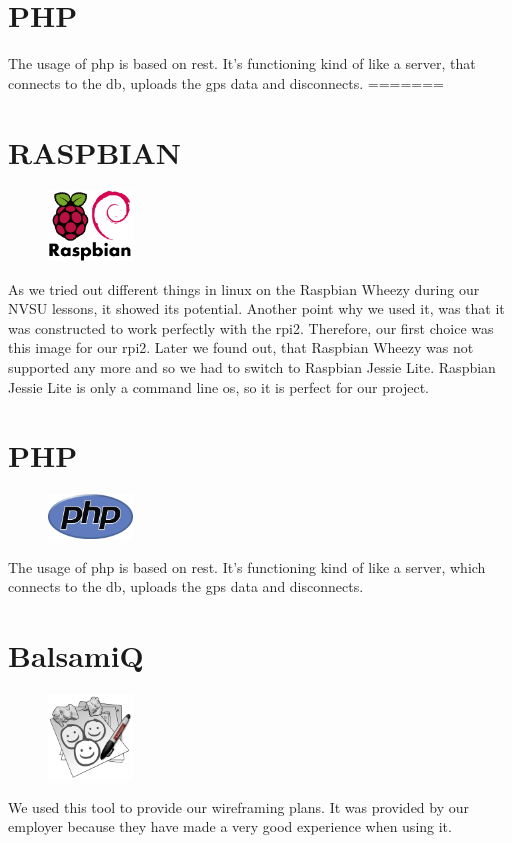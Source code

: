 \section{PHP}
The usage of \gls{php} is based on \gls{rest}. It's functioning kind of like a server, that connects to the \gls{db}, uploads the \gls{gps} data and disconnects.
=======
\section{RASPBIAN}
\begin{figure}
  \begin{center}
    \includegraphics[width=0.2\textwidth] {bilder/raspbian}
  \end{center}
\end{figure}
As we tried out different things in linux on the Raspbian Wheezy during our NVSU lessons, it showed its potential. Another point why we used it, was that it was constructed to work perfectly with the \gls{rpi2}. Therefore, our first choice was this image for our \gls{rpi2}. Later we found out, that Raspbian Wheezy was not supported any more and so we had to switch to Raspbian Jessie Lite. Raspbian Jessie Lite is only a command line \gls{os}, so it is perfect for our project.
\section{PHP}
\begin{figure}
  \begin{center}
    \includegraphics[width=0.2\textwidth] {bilder/php}
  \end{center}
\end{figure}
The usage of \gls{php} is based on \gls{rest}. It's functioning kind of like a server, which connects to the \gls{db}, uploads the \gls{gps} data and disconnects.
\section{BalsamiQ}
\begin{figure}
  \begin{center}
    \includegraphics[width=0.2\textwidth] {bilder/balsamiq}
  \end{center}
\end{figure}
We used this tool to provide our wireframing plans. It was provided by our employer because they have made a very good experience when using it.
